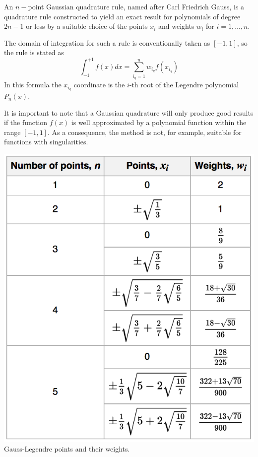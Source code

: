 An $n-$point Gaussian quadrature rule, named after Carl Friedrich Gauss, is a quadrature rule constructed
to yield an exact result for polynomials of degree $2n-1$ or less by a suitable choice of the points $x_i$
and weights $w_i$ for $i=1,\dots,n$.

The domain of integration for such a rule is conventionally taken as $[-1,1]$, so the rule is stated as
\[
\int_{-1}^{+1} f(x) dx = \sum_{i_q=1}^n w_{i_q} f(x_{i_q})
\]
In this formula the $x_{i_q}$ coordinate is 
the $i$-th root of the Legendre polynomial $P_n(x)$. 

It is important to note that a Gaussian quadrature will only produce good results if the function $f(x)$
is well approximated by a polynomial function within the range $[-1,1]$.
As a consequence, the method is not, for example, suitable for functions with singularities.

\begin{center}
\includegraphics[width=5.cm]{images/quadrature/gq2}\\
Gauss-Legendre points and their weights.
\end{center}

